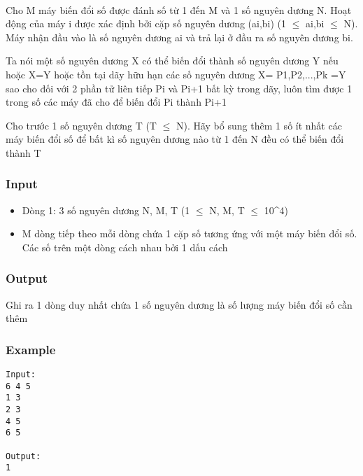 

 

Cho M máy biến đổi số được đánh số từ 1 đến M và 1 số nguyên dương N. Hoạt động của máy i được xác định bởi cặp số nguyên dương (ai,bi) (1 $\le$ ai,bi $\le$ N). Máy nhận đầu vào là số nguyên dương ai và trả lại ở đầu ra số nguyên dương bi.

Ta nói một số nguyên dương X có thể biến đổi thành số nguyên dương Y nếu hoặc X=Y hoặc tồn tại dãy hữu hạn các số nguyên dương X= P1,P2,...,Pk =Y sao cho đối với 2 phần tử liên tiếp Pi và Pi+1 bất kỳ trong dãy, luôn tìm được 1 trong số các máy đã cho để biến đổi Pi thành Pi+1

Cho trước 1 số nguyên dương T (T  $\le$  N). Hãy bổ sung thêm 1 số ít nhất các máy biến đổi số để bất kì số nguyên dương nào từ 1 đến N đều có thể biến đổi thành T

\subsubsection{Input}
\begin{itemize}
	\item Dòng 1: 3 số nguyên dương N, M, T (1  $\le$  N, M, T  $\le$  10\textasciicircum4)
	\item M dòng tiếp theo mỗi dòng chứa 1 cặp số tương ứng với một máy biến đổi số. Các số trên một dòng cách nhau bởi 1 dấu cách
\end{itemize}

\subsubsection{Output}

Ghi ra 1 dòng duy nhất chứa 1 số nguyên dương là số lượng máy biến đổi số cần thêm

\subsubsection{Example}
\begin{verbatim}
Input:
6 4 5
1 3
2 3
4 5
6 5

Output:
1
\end{verbatim}
